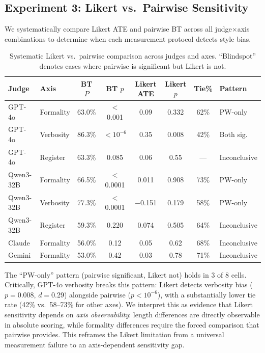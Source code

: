 \documentclass[11pt,a4paper]{article}
\begin{document}
\subsection{Experiment 3: Likert vs.\ Pairwise Sensitivity}
\label{sec:likert-pairwise}

We systematically compare Likert ATE and pairwise BT across all judge$\times$axis combinations to determine when each measurement protocol detects style bias.

\begin{table}[h]
\centering
\caption{Systematic Likert vs.\ pairwise comparison across judges and axes. ``Blindspot'' denotes cases where pairwise is significant but Likert is not.}
\label{tab:likert-pairwise}
\small
\begin{tabular}{llcccccl}
\toprule
\textbf{Judge} & \textbf{Axis} & \textbf{BT $P$} & \textbf{BT $p$} & \textbf{Likert ATE} & \textbf{Likert $p$} & \textbf{Tie\%} & \textbf{Pattern} \\
\midrule
GPT-4o & Formality & 63.0\% & $<$0.001 & 0.09 & 0.332 & 62\% & PW-only \\
GPT-4o & Verbosity & 86.3\% & $<10^{-6}$ & 0.35 & 0.008 & 42\% & Both sig. \\
GPT-4o & Register & 63.3\% & 0.085 & 0.06 & 0.55 & --- & Inconclusive \\
Qwen3-32B & Formality & 66.5\% & $<$0.0001 & 0.011 & 0.908 & 73\% & PW-only \\
Qwen3-32B & Verbosity & 77.3\% & $<$0.0001 & $-$0.151 & 0.179 & 58\% & PW-only \\
Qwen3-32B & Register & 59.3\% & 0.220 & 0.074 & 0.505 & 64\% & Inconclusive \\
Claude & Formality & 56.0\% & 0.12 & 0.05 & 0.62 & 68\% & Inconclusive \\
Gemini & Formality & 53.0\% & 0.42 & 0.03 & 0.78 & 71\% & Inconclusive \\
\bottomrule
\end{tabular}
\end{table}

The ``PW-only'' pattern (pairwise significant, Likert not) holds in 3 of 8 cells. Critically, GPT-4o verbosity breaks this pattern: Likert detects verbosity bias ($p{=}$0.008, $d{=}$0.29) alongside pairwise ($p<10^{-6}$), with a substantially lower tie rate (42\% vs.\ 58--73\% for other axes). We interpret this as evidence that Likert sensitivity depends on \emph{axis observability}: length differences are directly observable in absolute scoring, while formality differences require the forced comparison that pairwise provides. This reframes the Likert limitation from a universal measurement failure to an axis-dependent sensitivity gap.
\end{document}
